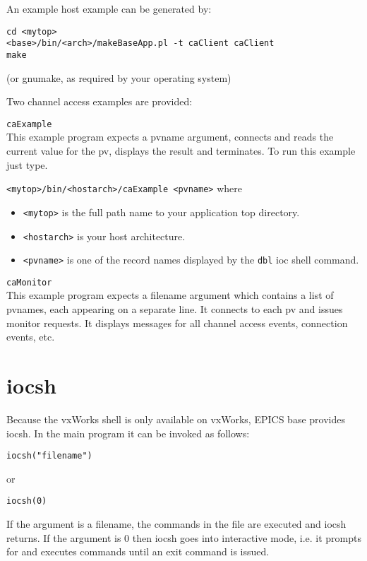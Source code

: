 An example host example can be generated by:

\begin{verbatim}
cd <mytop>
<base>/bin/<arch>/makeBaseApp.pl -t caClient caClient
make
\end{verbatim}
(or gnumake, as required by your operating system)

Two channel access examples are provided:

\begin{description}
\item \verb|caExample| \\
This example program expects a pvname argument, connects and reads the current value for the pv, displays the result 
and terminates. To run this example just type.

\verb|<mytop>/bin/<hostarch>/caExample <pvname>|  where

\begin{itemize}
\item \verb|<mytop>| is the full path name to your application top directory.

\item \verb|<hostarch>| is your host architecture.

\item \verb|<pvname>| is one of the record names displayed by the \verb|dbl| ioc shell command.
\end{itemize}

\item \verb|caMonitor| \\
This example program expects a filename argument which contains a list of pvnames, each appearing on a separate line.
It connects to each pv and issues monitor requests.
It displays messages for all channel access events, connection events, etc.
\end{description}

\section{iocsh}

Because the vxWorks shell is only available on vxWorks, EPICS base provides iocsh.
In the main program it can be invoked as follows:

\begin{verbatim}
iocsh("filename")
\end{verbatim}
or
\begin{verbatim}
iocsh(0)
\end{verbatim}
If the argument is a filename, the commands in the file are executed and iocsh returns.
If the argument is 0 then iocsh goes into interactive mode, i.e. it prompts for and executes commands until an exit command is issued.

